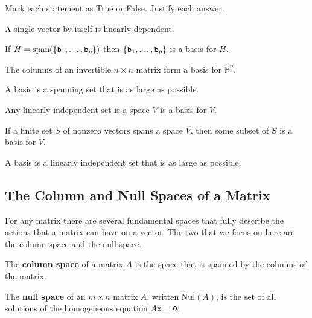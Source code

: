% 
% 
\begin{problem}
    Mark each statement as True or False.  Justify each answer.
\ba
\item A single vector by itself is linearly dependent.
\item If $H = \text{span}(\{\texttt{b}_1, \dots, \texttt{b}_p\})$ then $\{\texttt{b}_1, \dots, \texttt{b}_p\}$ is a
    basis for $H$.
\item The columns of an invertible $n \times n$ matrix form a basis for $\mathbb{R}^n$.
\item A basis is a spanning set that is as large as possible.
\item Any linearly independent set is a space $V$ is a basis for $V$.
\item If a finite set $S$ of nonzero vectors spans a space $V$, then some subset of $S$ is
    a basis for $V$.
\item A basis is a linearly independent set that is as large as possible.
\ea

\end{problem}
% 
\subsection{The Column and Null Spaces of a Matrix}
For any matrix there are several fundamental spaces that fully describe the actions that a
matrix can have on a vector.  The two that we focus on here are the column space and the
null space.

\begin{definition}
    The {\bf column space} of a matrix $A$ is the space that is spanned by the columns of the
    matrix.
\end{definition}

\begin{definition}
    The {\bf null space} of an $m \times n$ matrix $A$, written $\text{Nul}(A)$, is the
    set of all solutions of the homogeneous equation $A\texttt{x}=\texttt{0}$.
\end{definition}

